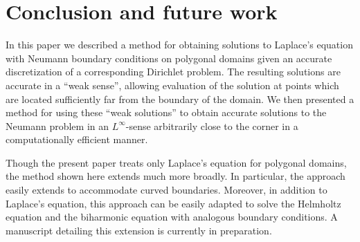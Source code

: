 
\section{Conclusion and future work}

In this paper we described a method for obtaining solutions to Laplace's equation with Neumann boundary conditions 
on polygonal domains given an accurate discretization of a corresponding Dirichlet problem. 
The resulting solutions are accurate in a 
``weak sense'', allowing evaluation of the solution at points which are located sufficiently far from the boundary of the 
domain. We then presented a method for using these ``weak solutions'' to obtain accurate solutions to the Neumann problem 
in an $L^\infty$-sense arbitrarily close to the corner in a computationally efficient manner. 

Though the present paper treats only Laplace's equation for polygonal domains, the method shown here extends 
much more broadly. In particular, the approach easily extends to accommodate curved boundaries. Moreover, in addition 
to Laplace's equation, this approach can be easily adapted to solve the Helmholtz equation and the biharmonic equation with analogous boundary conditions. A manuscript detailing this extension is currently in preparation.